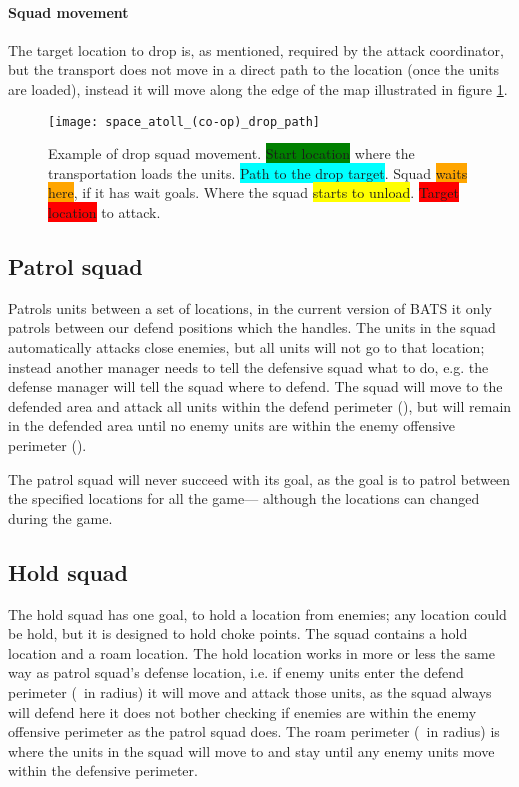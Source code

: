 \paragraph{Squad movement}
The target location to drop is, as mentioned, required by the attack coordinator, but the transport does not move in a direct path to the location (once the units are loaded), instead it will move along the edge of the map illustrated in figure \ref{fig:drop_squad_movement}.
\begin{figure}[htb]
\centering
\texttt{[image: space\_atoll\_(co-op)\_drop\_path]}
\caption[Example of drop squad movement]{Example of drop squad movement. \colorbox{green}{Start location} where the transportation loads the units. \colorbox{cyan}{Path to the drop target}. Squad \colorbox{Orange}{waits here}, if it has wait goals. Where the squad \colorbox{yellow}{starts to unload}. \colorbox{red}{Target location} to attack.}
\label{fig:drop_squad_movement}
\end{figure}

\subsection{Patrol squad}
\label{sec:patrol_squad}
Patrols units between a set of locations, in the current version of BATS it only patrols between our defend positions which the  handles. The units in the squad automatically attacks close enemies, but all units will not go to that location; instead another manager needs to tell the defensive squad what to do, e.g. the defense manager will tell the squad where to defend. The squad will move to the defended area and attack all units within the defend perimeter (\squadDefendDefendPerimeter), but will remain in the defended area until no enemy units are within the enemy offensive perimeter (\squadDefendEnemyOffensivePerimeter).

The patrol squad will never succeed with its goal, as the goal is to patrol between the specified locations for all the game— although the locations can changed during the game.


\subsection{Hold squad}
\label{sec:hold_squad}
The hold squad has one goal, to hold a location from enemies; any location could be hold, but it is designed to hold choke points. The squad contains a hold location and a roam location. The hold location works in more or less the same way as patrol squad's defense location, i.e. if enemy units enter the defend perimeter (\squadDefendDefendPerimeter~in radius) it will move and attack those units, as the squad always will defend here it does not bother checking if enemies are within the enemy offensive perimeter as the patrol squad does. The roam perimeter (\squadDefendRoamPerimeter~in radius) is where the units in the squad will move to and stay until any enemy units move within the defensive perimeter.

